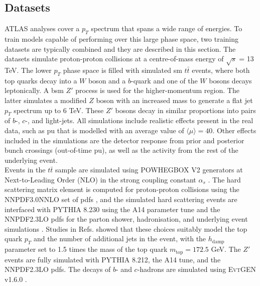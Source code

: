 \subsection{Datasets}\label{ftagdatasets}
ATLAS analyses cover a $p_T$ spectrum that spans a wide range of energies. To train models capable of performing over this large phase space, two training datasets are typically combined and they are described in this section. The datasets simulate proton-proton collisions at a centre-of-mass energy of $\sqrt{s}$ = 13 TeV. The lower $p_T$ phase space is filled with simulated \gls{sm} $t\bar{t}$ events, where both top quarks decay into a $W$ boson and a $b$-quark and one of the $W$ bosons decays leptonically. A \gls{bsm} $Z'$ process is used for the higher-momentum region. The latter simulates a modified $Z$ boson with an increased mass to generate a flat jet $p_T$ spectrum up to 6 TeV. These $Z'$ bosons decay in similar proportions into pairs of $b$-, $c$-, and light-jets. All simulations include realistic effects present in the real data, such as \gls{pu} that is modelled with an average value of $ \langle\mu\rangle = 40$. Other effects included in the simulations are the detector response from prior and posterior bunch crossings (out-of-time \gls{pu}), as well as the activity from the rest of the underlying event. \\

Events in the $t\bar{t}$ sample are simulated using \textsc{POWHEGBOX V2} generators at Next-to-Leading Order (NLO) in the strong coupling constant $\alpha_s$ \cite{PaoloNason_2004, StefanoFrixione_2007, StefanoFrixione_20072, POWHEGBOX}. The hard scattering matrix element is computed for proton-proton collisions using the \textsc{NNPDF3.0NNLO} set of \glspl{pdf} \cite{PDFLHCrun2}, and the simulated hard scattering events are interfaced with \textsc{PYTHIA 8.230} \cite{SJOSTRAND2015159} using the A14 parameter tune \cite{ATL-PHYS-PUB-2014-021} and the \textsc{NNPDF2.3LO} \glspl{pdf} for the parton shower, hadronisation, and underlying event simulations \cite{BALL2013244}. Studies in Refs. \cite{ATL-PHYS-PUB-2016-020, ATL-PHYS-PUB-2020-023} showed that these choices suitably model the top quark $p_T$ and the number of additional jets in the event, with the $h_{\textrm{damp}}$ parameter set to 1.5 times the mass of the top quark $m_{\textrm{top}} = 172.5$ GeV. The $Z'$ events are fully simulated with \textsc{PYTHIA 8.212}, the A14 tune, and the \textsc{NNPDF2.3LO} \glspl{pdf}. The decays of $b$- and $c$-hadrons are simulated using \textsc{EvtGEN} v1.6.0 \cite{LANGE2001152}. \\

